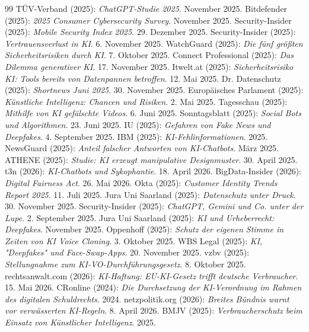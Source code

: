 \documentclass[12pt,a4paper]{article}
\begin{document}
\begin{thebibliography}{99}
		 TÜV-Verband (2025): \emph{ChatGPT-Studie 2025}. November 2025.
		 Bitdefender (2025): \emph{2025 Consumer Cybersecurity Survey}. November 2025.
		 Security-Insider (2025): \emph{Mobile Security Index 2025}. 29. Dezember 2025.
		 Security-Insider (2025): \emph{Vertrauensverlust in KI}. 6. November 2025.
		 WatchGuard (2025): \emph{Die fünf größten Sicherheitsrisiken durch KI}. 7. Oktober 2025.
		 Connect Professional (2025): \emph{Das Dilemma generativer KI}. 17. November 2025.
		 Itwelt.at (2025): \emph{Sicherheitsrisiko KI: Tools bereits von Datenpannen betroffen}. 12. Mai 2025.
		 Dr. Datenschutz (2025): \emph{Shortnews Juni 2025}. 30. November 2025.
		 Europäisches Parlament (2025): \emph{Künstliche Intelligenz: Chancen und Risiken}. 2. Mai 2025.
		 Tagesschau (2025): \emph{Mithilfe von KI gefälschte Videos}. 6. Juni 2025.
		 Sonntagsblatt (2025): \emph{Social Bots und Algorithmen}. 23. Juni 2025.
		 IU (2025): \emph{Gefahren von Fake News und Deepfakes}. 4. September 2025.
		 IBM (2025): \emph{KI-Fehlinformationen}. 2025.
		 NewsGuard (2025): \emph{Anteil falscher Antworten von KI-Chatbots}. März 2025.
		 ATHENE (2025): \emph{Studie: KI erzeugt manipulative Designmuster}. 30. April 2025.
		 t3n (2026): \emph{KI-Chatbots und Sykophantie}. 18. April 2026.
		 BigData-Insider (2026): \emph{Digital Fairness Act}. 26. Mai 2026.
		 Okta (2025): \emph{Customer Identity Trends Report 2025}. 11. Juli 2025.
		 Jura Uni Saarland (2025): \emph{Datenschutz unter Druck}. 30. November 2025.
		 Security-Insider (2025): \emph{ChatGPT, Gemini und Co. unter der Lupe}. 2. September 2025.
		 Jura Uni Saarland (2025): \emph{KI und Urheberrecht: Deepfakes}. November 2025.
		 Oppenhoff (2025): \emph{Schutz der eigenen Stimme in Zeiten von KI Voice Cloning}. 3. Oktober 2025.
		 WBS Legal (2025): \emph{KI, "Deepfakes" und Face-Swap-Apps}. 20. November 2025.
		 vzbv (2025): \emph{Stellungnahme zum KI-VO-Durchführungsgesetz}. 8. Oktober 2025.
		 rechtsanwalt.com (2026): \emph{KI-Haftung: EU-KI-Gesetz trifft deutsche Verbraucher}. 15. Mai 2026.
		 CRonline (2024): \emph{Die Durchsetzung der KI-Verordnung im Rahmen des digitalen Schuldrechts}. 2024.
		 netzpolitik.org (2026): \emph{Breites Bündnis warnt vor verwässerten KI-Regeln}. 8. April 2026.
		 BMJV (2025): \emph{Verbraucherschutz beim Einsatz von Künstlicher Intelligenz}. 2025.
		

\end{thebibliography}
\end{document}
